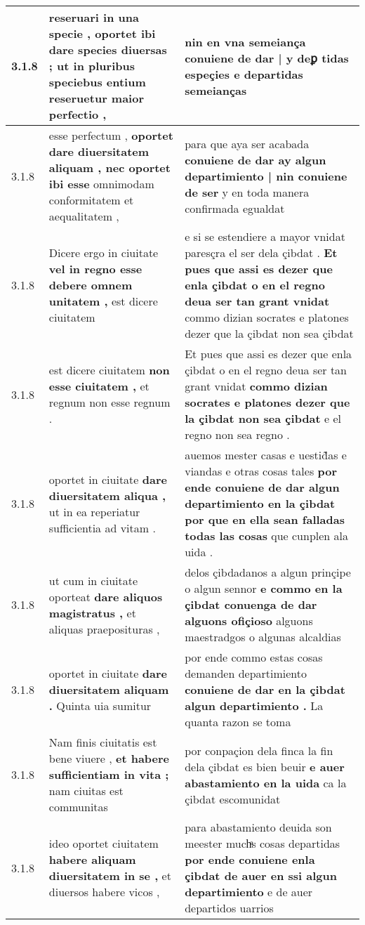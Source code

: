 \begin{tabular}{|p{1cm}|p{6.5cm}|p{6.5cm}|}
3.1.8 & reseruari in una specie , \textbf{ oportet ibi dare species diuersas ; } ut in pluribus speciebus entium reseruetur maior perfectio , & nin en vna semeiança \textbf{ conuiene de dar | y deꝑ tidas espeçies } e departidas semeianças \\\hline
3.1.8 & esse perfectum , \textbf{ oportet dare diuersitatem aliquam , nec oportet ibi esse } omnimodam conformitatem et aequalitatem , & para que aya ser acabada \textbf{ conuiene de dar ay algun departimiento | nin conuiene de ser } y en toda manera confirmada egualdat \\\hline
3.1.8 & Dicere ergo in ciuitate \textbf{ vel in regno esse debere omnem unitatem , } est dicere ciuitatem & e si se estendiere a mayor vnidat paresçra el ser dela çibdat . \textbf{ Et pues que assi es dezer que enla çibdat o en el regno deua ser tan grant vnidat } commo dizian socrates e platones dezer que la çibdat non sea çibdat \\\hline
3.1.8 & est dicere ciuitatem \textbf{ non esse ciuitatem , } et regnum non esse regnum . & Et pues que assi es dezer que enla çibdat o en el regno deua ser tan grant vnidat \textbf{ commo dizian socrates e platones dezer que la çibdat non sea çibdat } e el regno non sea regno . \\\hline
3.1.8 & oportet in ciuitate \textbf{ dare diuersitatem aliqua , } ut in ea reperiatur sufficientia ad vitam . & auemos mester casas e uestid̃as e viandas e otras cosas tales \textbf{ por ende conuiene de dar algun departimiento en la çibdat por que en ella sean falladas todas las cosas } que cunplen ala uida . \\\hline
3.1.8 & ut cum in ciuitate oporteat \textbf{ dare aliquos magistratus , } et aliquas praeposituras , & delos çibdadanos a algun prinçipe o algun sennor \textbf{ e commo en la çibdat conuenga de dar alguons ofiçioso } alguons maestradgos o algunas alcaldias \\\hline
3.1.8 & oportet in ciuitate \textbf{ dare diuersitatem aliquam . } Quinta uia sumitur & por ende commo estas cosas demanden departimiento \textbf{ conuiene de dar en la çibdat algun departimiento . } La quanta razon se toma \\\hline
3.1.8 & Nam finis ciuitatis est bene viuere , \textbf{ et habere sufficientiam in vita ; } nam ciuitas est communitas & por conpaçion dela finca la fin dela çibdat es bien beuir \textbf{ e auer abastamiento en la uida } ca la çibdat escomunidat \\\hline
3.1.8 & ideo oportet ciuitatem \textbf{ habere aliquam diuersitatem in se , } et diuersos habere vicos , & para abastamiento deuida son meester muchͣs cosas departidas \textbf{ por ende conuiene enla çibdat de auer en ssi algun departimiento } e de auer departidos uarrios \\\hline

\end{tabular}
